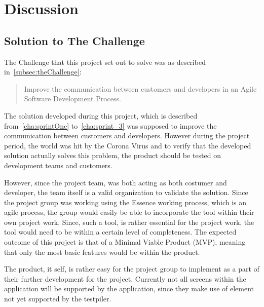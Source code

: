 \section{Discussion}

\subsection{Solution to The Challenge}

The Challenge that this project set out to solve was as described in~\autoref{subsec:theChallenge}:

\begin{quote}
    Improve the communication between customers and developers in an Agile Software Development Process.
\end{quote}

The solution developed during this project, which is described from~\autoref{cha:sprintOne} to~\autoref{cha:sprint_3} was supposed to improve the communication between customers and developers.
However during the project period, the world was hit by the Corona Virus and to verify that the developed solution actually solves this problem, the product should be tested on development teams and customers.

However, since the project team, was both acting as both costumer and developer, the team itself is a valid organization to validate the solution.
Since the project group was working using the Essence working process, which is an agile process, the group would easily be able to incorporate the tool within their own project work.
Since, such a tool, is rather essential for the project work, the tool would need to be within a certain level of completeness.
The expected outcome of this project is that of a Minimal Viable Product (MVP), meaning that only the most basic features would be within the product.

The product, it self, is rather easy for the project group to implement as a part of their further development for the project.
Currently not all screens within the application will be supported by the application, since they make use of element not yet supported by the testpiler.
